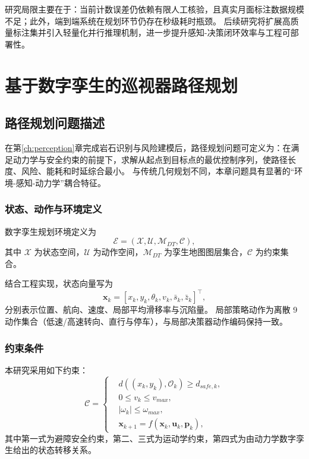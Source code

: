 \documentclass[UTF8,zihao=-4,a4paper,oneside,openany]{ctexrep}
\numberwithin{equation}{chapter}
\theoremstyle{plain}
\theoremstyle{definition}
\newcommand{\abs}[1]{\left| #1 \right|}
\begin{document}
研究局限主要在于：当前计数误差仍依赖有限人工核验，且真实月面标注数据规模不足；此外，端到端系统在规划环节仍存在秒级耗时瓶颈。
后续研究将扩展高质量标注集并引入轻量化并行推理机制，进一步提升感知-决策闭环效率与工程可部署性。



\chapter{基于数字孪生的巡视器路径规划}
\label{ch:planning}

\section{路径规划问题描述}
\label{sec:ch6_problem}

在第\ref{ch:perception}章完成岩石识别与风险建模后，路径规划问题可定义为：在满足动力学与安全约束的前提下，求解从起点到目标点的最优控制序列，使路径长度、风险、能耗和时延综合最小。
与传统几何规划不同，本章问题具有显著的“环境-感知-动力学”耦合特征。

\subsection{状态、动作与环境定义}
\label{subsec:ch6_state_action}

数字孪生规划环境定义为
\begin{equation}
\mathcal{E}=\left(\mathcal{X},\mathcal{U},\mathcal{M}_{DT},\mathcal{C}\right),
\label{eq:ch6_env_def}
\end{equation}
其中 $\mathcal{X}$ 为状态空间，$\mathcal{U}$ 为动作空间，$\mathcal{M}_{DT}$ 为孪生地图图层集合，$\mathcal{C}$ 为约束集合。

结合工程实现，状态向量写为
\begin{equation}
\mathbf{x}_k=\left[x_k,y_k,\theta_k,v_k,\bar{s}_k,\bar{z}_k\right]^\top,
\label{eq:ch6_state}
\end{equation}
分别表示位置、航向、速度、局部平均滑移率与沉陷量。
局部策略动作为离散 9 动作集合（低速/高速转向、直行与停车），与局部决策器动作编码保持一致。

\subsection{约束条件}
\label{subsec:ch6_constraints}

本研究采用如下约束：
\begin{equation}
\mathcal{C}=
\left\{
\begin{aligned}
&d\!\left((x_k,y_k),\mathcal{O}_k\right)\ge d_{safe,k},\\
&0\le v_k\le v_{max},\\
&\abs{\omega_k}\le \omega_{max},\\
&\mathbf{x}_{k+1}=f(\mathbf{x}_k,\mathbf{u}_k,\mathbf{p}_k),
\end{aligned}
\right.
\label{eq:ch6_constraints}
\end{equation}
其中第一式为避障安全约束，第二、三式为运动学约束，第四式为由动力学数字孪生给出的状态转移关系。
\end{document}
